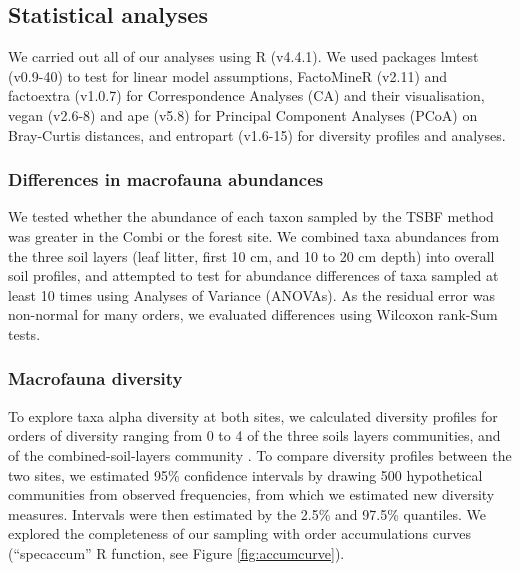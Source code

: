 \documentclass[fleqn,10pt]{ArtEcoFoG} %
\begin{document}
\subsection{Statistical analyses}\label{statistical-analyses}

We carried out all of our analyses using R (v4.4.1). We used packages lmtest (v0.9-40) to test for linear model assumptions, FactoMineR (v2.11) and factoextra (v1.0.7) for Correspondence Analyses (CA) and their visualisation, vegan (v2.6-8) and ape (v5.8) for Principal Component Analyses (PCoA) on Bray-Curtis distances, and entropart (v1.6-15) for diversity profiles and analyses.

\subsubsection{Differences in macrofauna abundances}\label{differences-in-macrofauna-abundances}

We tested whether the abundance of each taxon sampled by the TSBF method was greater in the Combi or the forest site. We combined taxa abundances from the three soil layers (leaf litter, first 10 cm, and 10 to 20 cm depth) into overall soil profiles, and attempted to test for abundance differences of taxa sampled at least 10 times using Analyses of Variance (ANOVAs). As the residual error was non-normal for many orders, we evaluated differences using Wilcoxon rank-Sum tests.

\subsubsection{Macrofauna diversity}\label{macrofauna-diversity}

To explore taxa alpha diversity at both sites, we calculated diversity profiles for orders of diversity ranging from 0 to 4 of the three soils layers communities, and of the combined-soil-layers community \citep[``entropart'' R package,][]{marcon_entropart_2015}. To compare diversity profiles between the two sites, we estimated 95\% confidence intervals by drawing 500 hypothetical communities from observed frequencies, from which we estimated new diversity measures. Intervals were then estimated by the 2.5\% and 97.5\% quantiles. We explored the completeness of our sampling with order accumulations curves (``specaccum'' R function, see Figure \ref{fig:accumcurve}).
\end{document}
